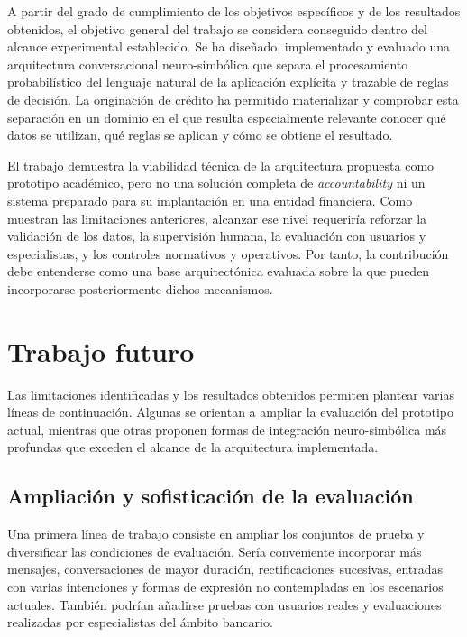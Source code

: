 \documentclass[12pt,a4paper]{report}
\begin{document}
A partir del grado de cumplimiento de los objetivos específicos y de los resultados obtenidos, el objetivo general del trabajo se considera conseguido dentro del alcance experimental establecido. Se ha diseñado, implementado y evaluado una arquitectura conversacional neuro-simbólica que separa el procesamiento probabilístico del lenguaje natural de la aplicación explícita y trazable de reglas de decisión. La originación de crédito ha permitido materializar y comprobar esta separación en un dominio en el que resulta especialmente relevante conocer qué datos se utilizan, qué reglas se aplican y cómo se obtiene el resultado.


El trabajo demuestra la viabilidad técnica de la arquitectura propuesta como prototipo académico, pero no una solución completa de \textit{accountability} ni un sistema preparado para su implantación en una entidad financiera. Como muestran las limitaciones anteriores, alcanzar ese nivel requeriría reforzar la validación de los datos, la supervisión humana, la evaluación con usuarios y especialistas, y los controles normativos y operativos. Por tanto, la contribución debe entenderse como una base arquitectónica evaluada sobre la que pueden incorporarse posteriormente dichos mecanismos.

\section{Trabajo futuro}

Las limitaciones identificadas y los resultados obtenidos permiten plantear varias líneas de continuación. Algunas se orientan a ampliar la evaluación del prototipo actual, mientras que otras proponen formas de integración neuro-simbólica más profundas que exceden el alcance de la arquitectura implementada.

\subsection{Ampliación y sofisticación de la evaluación}

Una primera línea de trabajo consiste en ampliar los conjuntos de prueba y diversificar las condiciones de evaluación. Sería conveniente incorporar más mensajes, conversaciones de mayor duración, rectificaciones sucesivas, entradas con varias intenciones y formas de expresión no contempladas en los escenarios actuales. También podrían añadirse pruebas con usuarios reales y evaluaciones realizadas por especialistas del ámbito bancario.
\end{document}
